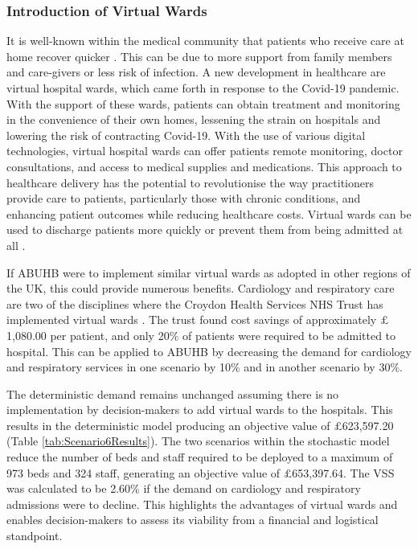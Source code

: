 \documentclass[../thesis.tex]{subfiles}
\begin{document}
\subsubsection{Introduction of Virtual Wards}
It is well-known within the medical community that patients who receive care at home recover quicker \cite{CHNFT2022}. This can be due to more support from family members and care-givers or less risk of infection. A new development in healthcare are virtual hospital wards, which came forth in response to the Covid-19 pandemic. With the support of these wards, patients can obtain treatment and monitoring in the convenience of their own homes, lessening the strain on hospitals and lowering the risk of contracting Covid-19. With the use of various digital technologies, virtual hospital wards can offer patients remote monitoring, doctor consultations, and access to medical supplies and medications. This approach to healthcare delivery has the potential to revolutionise the way practitioners provide care to patients, particularly those with chronic conditions, and enhancing patient outcomes while reducing healthcare costs. Virtual wards can be used to discharge patients more quickly or prevent them from being admitted at all \cite{Trueland2023}.

If ABUHB were to implement similar virtual wards as adopted in other regions of the UK, this could provide numerous benefits. Cardiology and respiratory care are two of the disciplines where the Croydon Health Services NHS Trust has implemented virtual wards \cite{HINSL2021}. The trust found cost savings of approximately $\pounds$1,080.00 per patient, and only 20\% of patients were required to be admitted to hospital. This can be applied to ABUHB by decreasing the demand for cardiology and respiratory services in one scenario by 10\% and in another scenario by 30\%.

The deterministic demand remains unchanged assuming there is no implementation by decision-makers to add virtual wards to the hospitals. This results in the deterministic model producing an objective value of $\pounds$623,597.20 (Table \ref{tab:Scenario6Results}). The two scenarios within the stochastic model reduce the number of beds and staff required to be deployed to a maximum of 973 beds and 324 staff, generating an objective value of $\pounds$653,397.64. The VSS was calculated to be 2.60\% if the demand on cardiology and respiratory admissions were to decline. This highlights the advantages of virtual wards and enables decision-makers to assess its viability from a financial and logistical standpoint.
\end{document}
